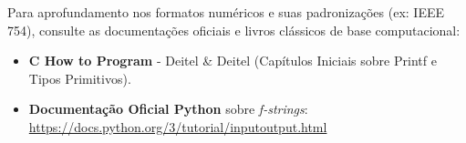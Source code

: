 \documentclass{article}
\begin{document}
\begin{notebox}
Para aprofundamento nos formatos numéricos e suas padronizações (ex: IEEE 754), consulte as documentações oficiais e livros clássicos de base computacional:
\begin{itemize}
    \item \textbf{C How to Program} - Deitel \& Deitel (Capítulos Iniciais sobre Printf e Tipos Primitivos).
    \item \textbf{Documentação Oficial Python} sobre \textit{f-strings}: \url{https://docs.python.org/3/tutorial/inputoutput.html}
\end{itemize}
\end{notebox}

\end{document}
